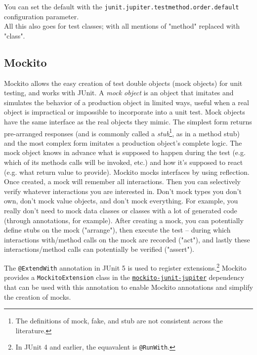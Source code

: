 \documentclass[table, xcdraw]{article}%
\begin{document}
You can set the default with the \texttt{junit.jupiter.testmethod.order.default} configuration parameter.\\
All this also goes for test classes; with all mentions of "method" replaced with "class".


\subsection{Mockito}

Mockito allows the easy creation of test double objects (mock objects) for unit testing, and works with JUnit. A \emph{mock object} is an object that imitates and simulates the behavior of a production object in limited ways, useful when a real object is impractical or impossible to incorporate into a unit test. Mock objects have the same interface as the real objects they mimic. The simplest form returns pre-arranged responses (and is commonly called a \emph{stub}\footnote{The definitions of mock, fake, and stub are not consistent across the literature.}, as in a method stub) and the most complex form imitates a production object's complete logic. The mock object knows in advance what is supposed to happen during the test (e.g. which of its methods calls will be invoked, etc.) and how it's supposed to react (e.g. what return value to provide). Mockito mocks interfaces by using reflection. Once created, a mock will remember all interactions. Then you can selectively verify whatever interactions you are interested in. Don't mock types you don’t own, don’t mock value objects, and don’t mock everything. For example, you really don't need to mock data classes or classes with a lot of generated code (through annotations, for example). After creating a mock, you can potentially define stubs on the mock ("arrange"), then execute the test -- during which interactions with/method calls on the mock are recorded ("act"), and lastly these interactions/method calls can potentially be verified ("assert").

The \texttt{@ExtendWith} annotation in JUnit 5 is used to register extensions.\footnote{In JUnit 4 and earlier, the equavalent is \texttt{@RunWith}.} Mockito provides a \texttt{MockitoExtension} class in the \href{https://mvnrepository.com/artifact/org.mockito/mockito-junit-jupiter}{\texttt{mockito-junit-jupiter}} dependency that can be used with this annotation to enable Mockito annotations and simplify the creation of mocks.
\end{document}
